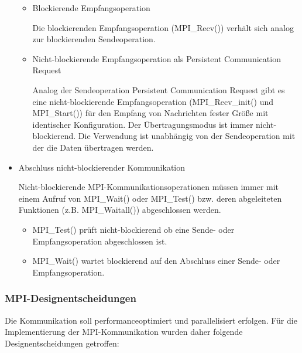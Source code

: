 \begin{itemize}
\begin{itemize}
		      \item Blockierende Empfangsoperation

		            Die blockierenden Empfangsoperation (MPI\_Recv()) verhält sich analog zur blockierenden Sendeoperation.

		      \item Nicht-blockierende Empfangsoperation als Persistent Communication Request

		            Analog der Sendeoperation Persistent Communication Request gibt es eine nicht-blockierende Empfangsoperation (MPI\_Recv\_init() und MPI\_Start()) für den Empfang von Nachrichten fester Größe mit identischer Konfiguration. Der Übertragungsmodus ist immer nicht-blockierend. Die Verwendung ist unabhängig von der Sendeoperation mit der die Daten übertragen werden.

	      \end{itemize}

	\item Abschluss nicht-blockierender Kommunikation

	      Nicht-blockierende MPI-Kommunikationsoperationen müssen immer mit einem Aufruf von MPI\_Wait() oder MPI\_Test() bzw. deren abgeleiteten Funktionen (z.B. MPI\_Waitall()) abgeschlossen werden.

	      \begin{itemize}
		      \item MPI\_Test() prüft nicht-blockierend ob eine Sende- oder Empfangsoperation abgeschlossen ist.

		      \item MPI\_Wait() wartet blockierend auf den Abschluss einer Sende- oder Empfangsoperation.
	      \end{itemize}

\end{itemize}

\subsubsection{MPI-Designentscheidungen}
Die Kommunikation soll performanceoptimiert und parallelisiert erfolgen.
Für die Implementierung der MPI-Kommunikation wurden daher folgende Designentscheidungen getroffen:

